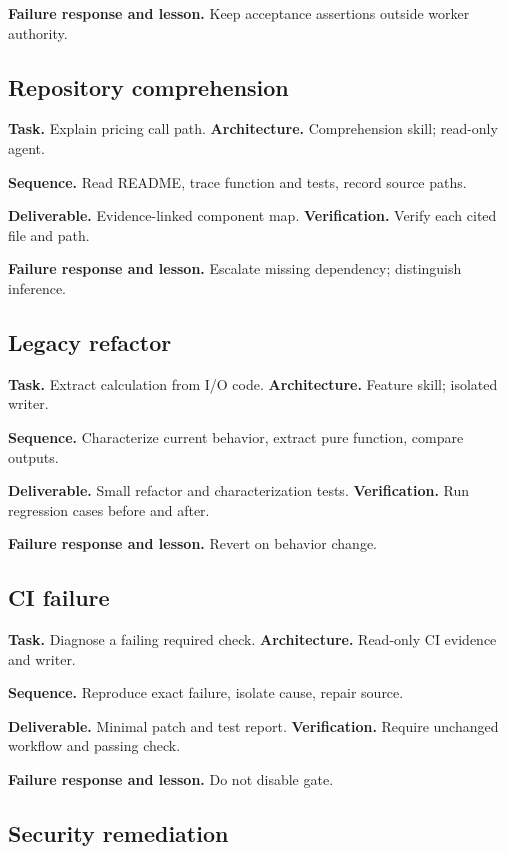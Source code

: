 \textbf{Failure response and lesson.} Keep acceptance assertions outside worker authority.

\subsection{Repository comprehension}

\textbf{Task.} Explain pricing call path. \textbf{Architecture.} Comprehension skill; read-only agent.

\textbf{Sequence.} Read README, trace function and tests, record source paths.

\textbf{Deliverable.} Evidence-linked component map. \textbf{Verification.} Verify each cited file and path.

\textbf{Failure response and lesson.} Escalate missing dependency; distinguish inference.

\subsection{Legacy refactor}

\textbf{Task.} Extract calculation from I/O code. \textbf{Architecture.} Feature skill; isolated writer.

\textbf{Sequence.} Characterize current behavior, extract pure function, compare outputs.

\textbf{Deliverable.} Small refactor and characterization tests. \textbf{Verification.} Run regression cases before and after.

\textbf{Failure response and lesson.} Revert on behavior change.

\subsection{CI failure}

\textbf{Task.} Diagnose a failing required check. \textbf{Architecture.} Read-only CI evidence and writer.

\textbf{Sequence.} Reproduce exact failure, isolate cause, repair source.

\textbf{Deliverable.} Minimal patch and test report. \textbf{Verification.} Require unchanged workflow and passing check.

\textbf{Failure response and lesson.} Do not disable gate.

\subsection{Security remediation}

